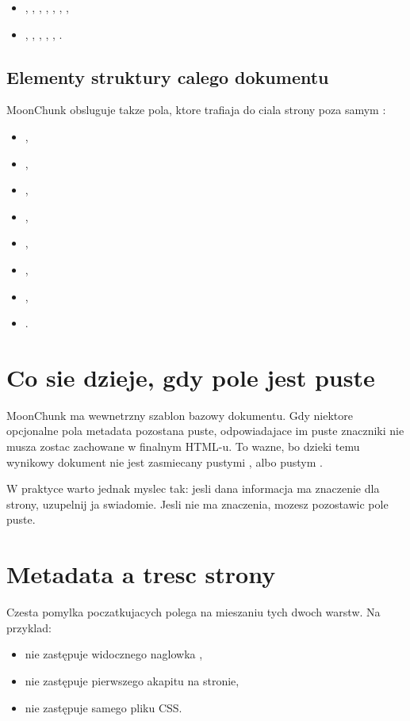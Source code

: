 \begin{itemize}
  \item {}, , , , ,
        , ,
  \item {}, , , ,
        , .
\end{itemize}

\subsection*{Elementy struktury calego dokumentu}
MoonChunk obsluguje takze pola, ktore trafiaja do ciala strony poza samym :

\begin{itemize}
  \item {},
  \item {},
  \item {},
  \item {},
  \item {},
  \item {},
  \item {},
  \item {}.
\end{itemize}

\section{Co sie dzieje, gdy pole jest puste}
MoonChunk ma wewnetrzny szablon bazowy dokumentu. Gdy niektore opcjonalne pola metadata
pozostana puste, odpowiadajace im puste znaczniki nie musza zostac zachowane w finalnym
HTML-u. To wazne, bo dzieki temu wynikowy dokument nie jest zasmiecany pustymi
,  albo pustym .

W praktyce warto jednak myslec tak: jesli dana informacja ma znaczenie dla strony,
uzupelnij ja swiadomie. Jesli nie ma znaczenia, mozesz pozostawic pole puste.

\section{Metadata a tresc strony}
Czesta pomylka poczatkujacych polega na mieszaniu tych dwoch warstw. Na przyklad:

\begin{itemize}
  \item {} nie zastępuje widocznego naglowka ,
  \item {} nie zastępuje pierwszego akapitu na stronie,
  \item {} nie zastępuje samego pliku CSS.
\end{itemize}

